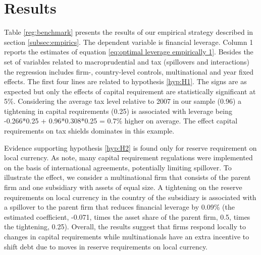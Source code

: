 \documentclass[12pt]{article}
\begin{document}
	\section{Results} \label{sec:result}
	 Table \ref{reg:benchmark} presents the results of our empirical strategy described in section \ref{subsec:empirics}. The dependent variable is financial leverage. Column 1 reports the estimates of equation \ref{eq:optimal leverage empirically 1}. Besides the set of variables related to macroprudential and tax (spillovers and interactions) the regression includes firm-, country-level controls, multinational and year fixed effects. The first four lines are related to hypothesis \ref{hyp:H1}. The signs are as expected but only the effects of capital requirement are statistically significant at 5\%. Considering the average tax level relative to 2007 in our sample (0.96) a tightening in capital requirements (0.25) is associated with leverage being -0.266*0.25 + 0.96*0.308*0.25 = 0.7\% higher on average. The effect capital requirements on tax shields dominates in this example.   
	 
	 	\begin{small}
	 	{
	 		
	 	}
	 \end{small}
 
	Evidence supporting hypothesis \ref{hyp:H2} is found only for reserve requirement on local currency. As \cite{buch2017cross} note, many capital requirement regulations were implemented on the basis of international agreements, potentially limiting spillover. To illustrate the effect, we consider a multinational firm that consists of the parent firm and one subsidiary with assets of equal size. A tightening on the reserve requirements on local currency in the country of the subsidiary is associated with a spillover to the parent firm that reduces financial leverage by 0.09\% (the estimated coefficient, -0.071, times the  asset share of the parent firm, 0.5, times the tightening, 0.25). Overall, the results suggest that firms respond locally to changes in capital requirements while multinationals have an extra incentive to shift debt due to moves in reserve requirements on local currency.
	 
\end{document}
